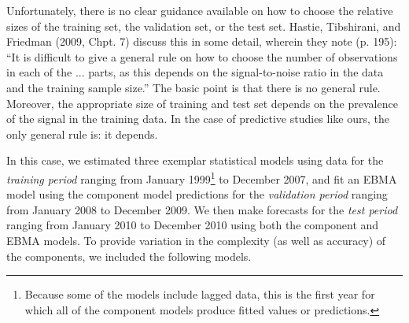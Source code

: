 \documentclass[12pt,fullpage,endnotes]{article}
\newcommand{\note}[1]{\footnote{ #1 \vspace{4 mm}}}
\begin{document}
Unfortunately, there is no clear guidance available on how to choose
the relative sizes of the training set, the validation set, or the
test set.  Hastie, Tibshirani, and Friedman (2009, Chpt. 7) discuss
this in some detail, wherein they note (p. 195): ``It is difficult to
give a general rule on how to choose the number of observations in
each of the ... parts, as this depends on the signal-to-noise ratio in
the data and the training sample size.''  The basic point is that there is
no general rule. Moreover, the appropriate size of training and test set
depends on the prevalence of the signal in the training data. In the
case of predictive studies like ours, the only general rule is: it
depends.  %

In this case, we estimated three exemplar statistical models using
data for the \textit{training period} ranging from January
1999\note{Because some of the models include lagged data, this is the
  first year for which all of the component models produce fitted values or predictions.} to
December 2007, and fit an EBMA model using the component model
predictions for the \textit{validation period} ranging from January
2008 to December 2009.  We then make forecasts for the \textit{test
  period} ranging from January 2010 to December 2010 using both the
component and EBMA models.  To provide variation in the complexity (as
well as accuracy) of the components, we included the following models.

\end{document}
